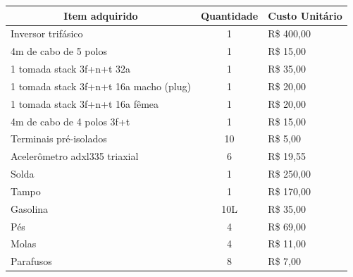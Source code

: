 \begin{table}[H]
\centering
\begin{tabular}{|l|c|l|}
\hline
\multicolumn{1}{|c|}{\textbf{Item adquirido}} & \textbf{Quantidade} & \multicolumn{1}{c|}{\textbf{Custo Unitário}} \\ \hline
Inversor trifásico                                          & 1                & R\$ 400,00                           \\ \hline
4m de cabo de 5 polos                                 & 1                & R\$ 15,00                             \\ \hline
1 tomada stack 3f+n+t 32a                         & 1                & R\$ 35,00                             \\ \hline
1 tomada stack 3f+n+t 16a macho (plug)  & 1                 & R\$ 20,00                             \\ \hline
1 tomada stack 3f+n+t 16a fêmea             & 1                 & R\$ 20,00                             \\ \hline
4m de cabo de 4 polos 3f+t                         & 1                 & R\$ 15,00                             \\ \hline
Terminais pré-isolados                                 & 10               & R\$ 5,00                                \\ \hline
Acelerômetro adxl335 triaxial                      & 6                 & R\$ 19,55                              \\ \hline
Solda                                                              & 1                 & R\$ 250,00                            \\ \hline
Tampo                                                           & 1                  & R\$ 170,00                           \\ \hline
Gasolina                                                        & 10L              & R\$ 35,00                             \\ \hline
Pés                                                                 & 4                 & R\$ 69,00                             \\ \hline
Molas                                                             & 4                 & R\$ 11,00                              \\ \hline
Parafusos                                                       & 8                 & R\$ 7,00                                \\ \hline

\end{tabular}
\end{table}
